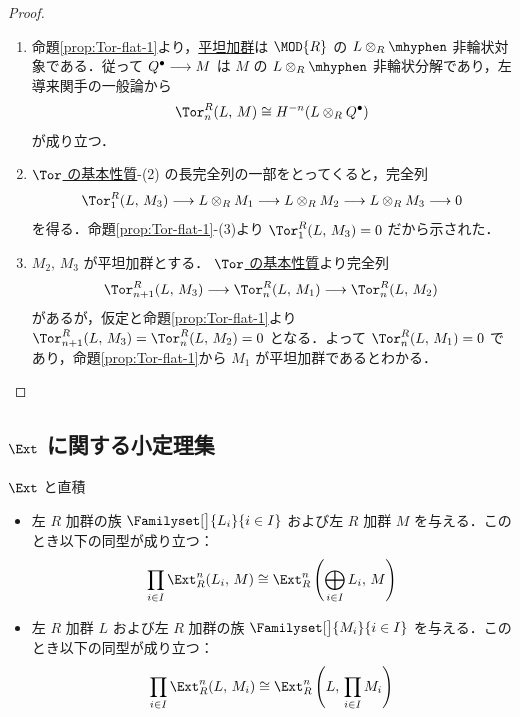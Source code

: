 \documentclass[algtopo_main]{subfiles}
\begin{document}
\begin{proof}
    \begin{enumerate}
        \item 命題\ref{prop:Tor-flat-1}より，\hyperref[def:flat-mod]{平坦加群}は $\MOD{R}$ の $L \otimes_R \mhyphen$ 非輪状対象である．従って $Q^\bullet \longrightarrow M$ は $M$ の $L \otimes_R \mhyphen$ 非輪状分解であり，左導来関手の一般論から
        \begin{align}
            \Tor^R_n(L,\, M) \cong H^{-n} (L \otimes_R Q^\bullet)
        \end{align}
        が成り立つ．
        \item \hyperref[prop:Tor-basic]{$\Tor$ の基本性質}-(2) の長完全列の一部をとってくると，完全列
        \begin{align}
            \Tor_1^R(L,\, M_3) \lto L \otimes_R M_1 \lto L \otimes_R M_2 \lto L \otimes_R M_3 \lto 0
        \end{align}
        を得る．命題\ref{prop:Tor-flat-1}-(3)より $\Tor_1^R(L,\, M_3) = 0$ だから示された．
        \item $M_2,\, M_3$ が平坦加群とする．
        \hyperref[prop:Tor-basic]{$\Tor$ の基本性質}より完全列
        \begin{align}
            \Tor_{n+1}^R(L,\, M_3) \lto \Tor_{n}^R(L,\, M_1) \lto \Tor_{n}^R(L,\, M_2)
        \end{align}
        があるが，仮定と命題\ref{prop:Tor-flat-1}より $\Tor_{n+1}^R(L,\, M_3) = \Tor_{n}^R(L,\, M_2) = 0$ となる．よって $\Tor_{n}^R(L,\, M_1) = 0$ であり，命題\ref{prop:Tor-flat-1}から $M_1$ が平坦加群であるとわかる．
    \end{enumerate}
\end{proof}


\subsection{$\Ext$ に関する小定理集}

\begin{myprop}[]{$\Ext$ と直積}
    \begin{itemize}
        \item 左 $R$ 加群の族 $\Familyset[\big]{L_i}{i\in I}$ および左 $R$ 加群 $M$ を与える．このとき以下の同型が成り立つ：
        \begin{align}
            \prod_{i \in I} \Ext_R^n (L_i,\, M) \cong \Ext_R^n \left( \bigoplus_{i\in I} L_i,\, M \right) 
        \end{align}
        \item 左 $R$ 加群 $L$ および左 $R$ 加群の族 $\Familyset[\big]{M_i}{i\in I}$ を与える．このとき以下の同型が成り立つ：
        \begin{align}
            \prod_{i \in I} \Ext_R^n (L,\, M_i) \cong \Ext_R^n \left( L,\, \prod_{i\in I} M_i \right) 
        \end{align}
    \end{itemize}
    
\end{myprop}
\end{document}
